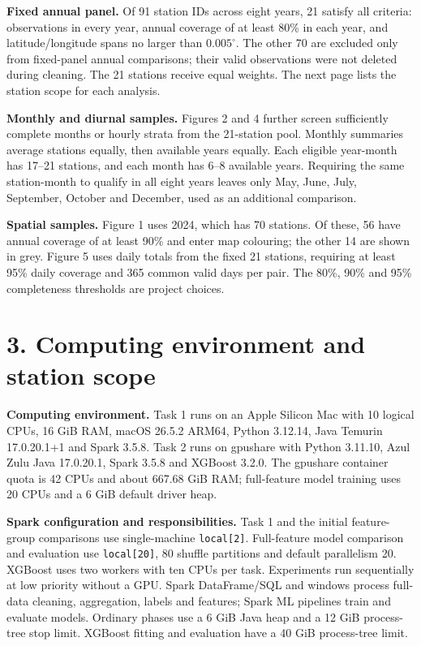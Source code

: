 \documentclass[UTF8,fontset=fandol,10pt,a4paper,landscape]{ctexart}
\begin{document}
\textbf{Fixed annual panel.} Of 91 station IDs across eight years, 21 satisfy all criteria: observations in every year, annual coverage of at least 80\% in each year, and latitude/longitude spans no larger than $0.005^\circ$. The other 70 are excluded only from fixed-panel annual comparisons; their valid observations were not deleted during cleaning. The 21 stations receive equal weights. The next page lists the station scope for each analysis.

\textbf{Monthly and diurnal samples.} Figures 2 and 4 further screen sufficiently complete months or hourly strata from the 21-station pool. Monthly summaries average stations equally, then available years equally. Each eligible year-month has 17--21 stations, and each month has 6--8 available years. Requiring the same station-month to qualify in all eight years leaves only May, June, July, September, October and December, used as an additional comparison.

\textbf{Spatial samples.} Figure 1 uses 2024, which has 70 stations. Of these, 56 have annual coverage of at least 90\% and enter map colouring; the other 14 are shown in grey. Figure 5 uses daily totals from the fixed 21 stations, requiring at least 95\% daily coverage and 365 common valid days per pair. The 80\%, 90\% and 95\% completeness thresholds are project choices.

\clearpage\section*{3. Computing environment and station scope}

\textbf{Computing environment.} Task 1 runs on an Apple Silicon Mac with 10 logical CPUs, 16 GiB RAM, macOS 26.5.2 ARM64, Python 3.12.14, Java Temurin 17.0.20.1+1 and Spark 3.5.8. Task 2 runs on gpushare with Python 3.11.10, Azul Zulu Java 17.0.20.1, Spark 3.5.8 and XGBoost 3.2.0. The gpushare container quota is 42 CPUs and about 667.68 GiB RAM; full-feature model training uses 20 CPUs and a 6 GiB default driver heap.

\textbf{Spark configuration and responsibilities.} Task 1 and the initial feature-group comparisons use single-machine \texttt{local[2]}. Full-feature model comparison and evaluation use \texttt{local[20]}, 80 shuffle partitions and default parallelism 20. XGBoost uses two workers with ten CPUs per task. Experiments run sequentially at low priority without a GPU. Spark DataFrame/SQL and windows process full-data cleaning, aggregation, labels and features; Spark ML pipelines train and evaluate models. Ordinary phases use a 6 GiB Java heap and a 12 GiB process-tree stop limit. XGBoost fitting and evaluation have a 40 GiB process-tree limit.
\end{document}
